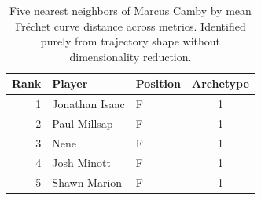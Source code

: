 \begin{table}[htbp]
  \centering\small
  \begin{tabular}{rllc}
    \toprule
    Rank & Player & Position & Archetype \\
    \midrule
    1 & Jonathan Isaac & F & 1 \\
    2 & Paul Millsap & F & 1 \\
    3 & Nene & F & 1 \\
    4 & Josh Minott & F & 1 \\
    5 & Shawn Marion & F & 1 \\
    \bottomrule
  \end{tabular}
  \caption{Five nearest neighbors of Marcus Camby by mean Fr\'{e}chet curve distance across metrics. Identified purely from trajectory shape without dimensionality reduction.}
  \label{tab:Marcus_Camby_frechet_curve_neighbors}
\end{table}

